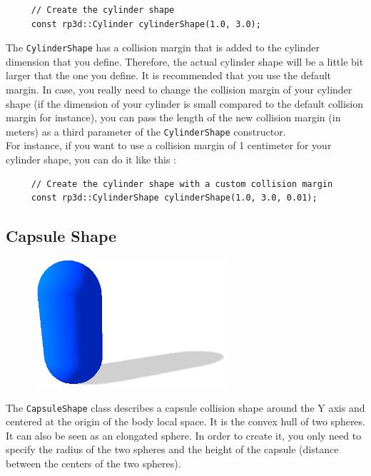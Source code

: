 \documentclass[a4paper,12pt]{article}
\begin{document}
    \begin{lstlisting}
     // Create the cylinder shape
     const rp3d::Cylinder cylinderShape(1.0, 3.0);
  \end{lstlisting}

    \vspace{0.6cm}

    The \texttt{CylinderShape} has a collision margin that is added to the cylinder dimension that you define. Therefore, the actual cylinder shape will be a little bit larger that the one you define.
    It is recommended that you use the default margin. In case, you really need to change the collision margin of your cylinder shape (if the dimension of your cylinder is small compared
    to the default collision margin for instance), you can pass the length of the new collision margin (in meters) as a third parameter of the \texttt{CylinderShape} constructor. \\

    For instance, if you want to use a collision margin of 1 centimeter for your cylinder shape, you can do it like this : \\

   \begin{lstlisting}
     // Create the cylinder shape with a custom collision margin
     const rp3d::CylinderShape cylinderShape(1.0, 3.0, 0.01);
  \end{lstlisting}

    \subsection{Capsule Shape}

    \begin{figure}[h]
        \centering
        \includegraphics{capsuleshape.png}
        \label{fig:capsuleshape}
    \end{figure}

    The \texttt{CapsuleShape} class describes a capsule collision shape around the Y axis and centered at the origin of the body local space. It is the convex hull of two
    spheres. It can also be seen as an elongated sphere. In order to create it, you only need to specify the radius of the two spheres and the height of the
    capsule (distance between the centers of the two spheres).  \\
\end{document}
